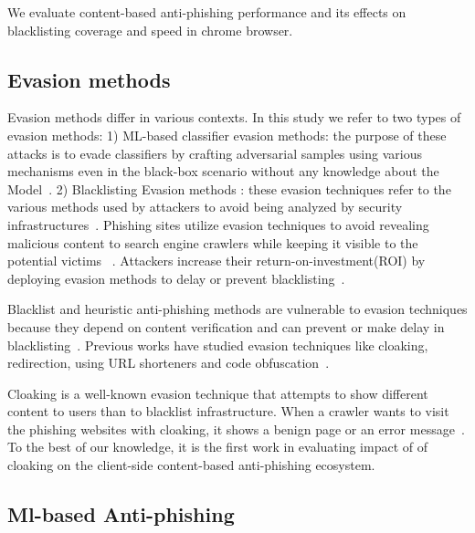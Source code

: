 We evaluate content-based anti-phishing performance and its effects on blacklisting coverage and speed in chrome browser.

\subsection{Evasion methods}
Evasion methods differ in various contexts. In this study we refer to two types of evasion methods:
1) ML-based classifier evasion methods: the purpose of these attacks is to evade classifiers by crafting adversarial samples using various mechanisms even in the black-box scenario without any knowledge about the Model~\cite{anderson2019adversarial}. 
2) Blacklisting Evasion methods : these evasion techniques refer to the various methods used by attackers to avoid being analyzed by security infrastructures~\cite{egele2008survey}.
Phishing sites utilize evasion techniques to avoid revealing malicious content to search engine crawlers while keeping it visible to the potential victims ~\cite{samarasinghe2020cloaking, invernizzi2016cloak,panum2020towards}. 
Attackers increase their return-on-investment(ROI) by deploying evasion methods to delay or prevent blacklisting~\cite{han2016phisheye,nero2011phishing,oest2019phishfarm}. 

Blacklist and heuristic anti-phishing methods are vulnerable to evasion techniques because they depend on content verification and can prevent or make delay in blacklisting~\cite{oest2019phishfarm}.
Previous works have studied evasion techniques like cloaking, redirection, using URL shorteners and code obfuscation~\cite{fette2007learning,cova2008there,chhabra2011phi}.

Cloaking is a well-known evasion technique that attempts to show different content to users than to blacklist infrastructure. When a crawler wants to visit the phishing websites with cloaking, it shows a benign page or an error message~\cite{invernizzi2016cloak}.
To the best of our knowledge, it is the first work in evaluating impact of of cloaking on the client-side content-based anti-phishing ecosystem.

\subsection{Ml-based Anti-phishing}

